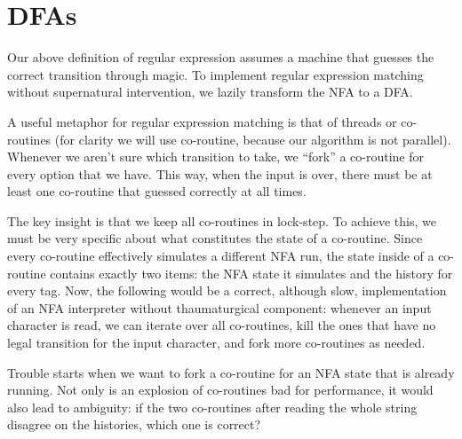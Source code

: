 \documentclass[11pt]{Thesis}
\theoremstyle{definition}
\newcommand{\seclabel}[1]{\label{sec:#1}}
\begin{document}
\section{DFAs}	\seclabel{dfa}

Our above definition of regular expression assumes a machine that
guesses the correct transition through magic. To implement regular
expression matching without supernatural intervention, we lazily transform
the NFA to a DFA. 

A useful metaphor for regular expression matching is that of 
threads\cite{Cox07a} or co-routines (for clarity we will use 
co-routine, because our algorithm is not parallel).
Whenever we aren't sure which transition to take,
we ``fork'' a co-routine for every option that we have. This way, when
the input is over, there must be at least one co-routine that guessed
correctly at all times. 

The key insight is that we keep all co-routines in lock-step. To
achieve this, we must be very specific about what constitutes the
state of a co-routine. Since every co-routine effectively simulates a different
NFA run, the state inside of a co-routine contains exactly two items: the
NFA state it simulates and the history for every tag. Now, the following
would be a correct, although slow, implementation of an NFA
interpreter without thaumaturgical component: whenever an input character
is read, we can iterate over
all co-routines, kill the ones that have no legal transition for the input
character, and fork more co-routines as needed.

Trouble starts when we want to fork a co-routine for an NFA state that
is already running. Not only is an explosion of co-routines bad for
performance, it would also lead to ambiguity: if the two co-routines
after reading the whole string disagree on the histories, which one is correct?
\end{document}
